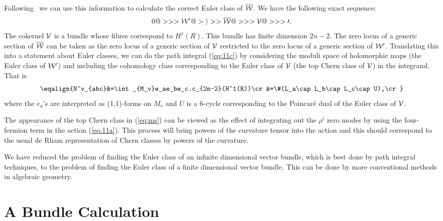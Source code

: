 Following~\cite{W:matrx} we can use this information to calculate the
correct Euler class of $\overline{\cal{W}}$. We have the following exact sequence:
\begin{equation}
  0 @>>> \cal{W}^\prime @>i>> \overline{\cal{W}} @>>> \cal{V} @>>> 0.
\end{equation}
The cokernel $\cal{V}$ is a bundle
whose fibres correspond to $H^1(R)$. This bundle has finite dimension
$2n-2$. The zero locus of a generic section of $\overline{\cal{W}}$ can be taken as
the zero locus of a generic section of $\cal{V}$ restricted to the zero
locus of a generic section of $\cal{W}^\prime$. Translating this into a
statement about Euler classes, we can do the path integral
(\ref{eq:11c}) by considering the moduli space of holomorphic maps
(the Euler class of $\cal{W}^\prime$) and including the cohomology class
corresponding to the Euler class of $\cal{V}$ (the top Chern class
of $\cal{V}$) in the integrand. That is
\begin{equation}
  \eqalign{N^v_{abc}&=\int_{M_v}e_ae_be_c.c_{2n-2}(H^1(R))\cr
	&=\#(L_a\cap L_b\cap L_c\cap U),\cr} \label{eq:ms}
\end{equation}
where the $e_a$'s are interpreted as (1,1)-forms on $M_v$ and $U$ is a
6-cycle corresponding to the Poincar\'e dual of the Euler class of $\cal{V}$.

The appearance of the top Chern class in (\ref{eq:ms}) can be viewed
as the effect of integrating out the $\rho^i$ zero modes by using the
four-fermion term in the action (\ref{eq:11a}). This process will
bring powers of the curvature tensor into the action and this should
correspond to the usual de Rham representation of Chern classes by
powers of the curvature.

We have reduced the problem of finding the Euler class of an infinite
dimensional vector bundle, which is best done by path integral
techniques, to the problem of finding the Euler class of a finite
dimensional vector bundle. This can be done by more conventional
methods in algebraic geometry.


\section{A Bundle Calculation}


